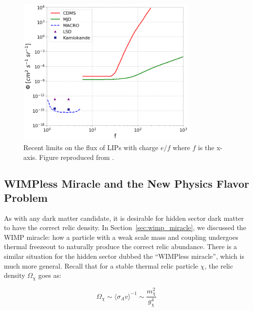 \begin{figure}[htbp]
\begin{center}
\includegraphics[width=0.8\textwidth]{figures/theory/lip_limits.png}
\caption{Recent limits on the flux of \acs{LIP}s with charge $e/f$ where $f$ is the x-axis. Figure reproduced from \cite{Alvis2018}. }
\label{fig:lip_lims}
\end{center}
\end{figure}


\subsection{WIMPless Miracle and the New Physics Flavor Problem}
As with any dark matter candidate, it is desirable for hidden sector dark matter to have the correct relic density. In Section~\ref{sec:wimp_miracle}, we discussed the \ac{WIMP} miracle: how a particle with a weak scale mass and coupling undergoes thermal freezeout to naturally produce the correct relic abundance. There is a similar situation for the hidden sector dubbed the ``\ac{WIMP}less miracle'', which is much more general. Recall that for a stable thermal relic particle $\chi$, the relic density $\Omega_{\chi}$ goes as:

\begin{equation}
\Omega_{\chi} \sim \langle \sigma_{A}v \rangle^{-1} \sim \frac{m_{\chi}^{2}}{g_{\chi}^{4}}
\end{equation}

